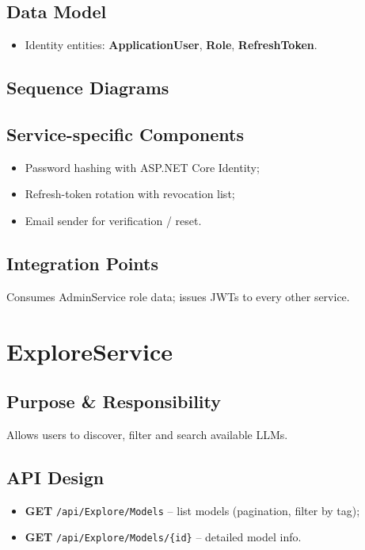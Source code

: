 \subsection{Data Model}
\begin{itemize}
  \item Identity entities: \textbf{ApplicationUser}, \textbf{Role}, \textbf{RefreshToken}.
\end{itemize}

\subsection{Sequence Diagrams}

\subsection{Service-specific Components}
\begin{itemize}
  \item Password hashing with ASP.NET Core Identity;
  \item Refresh-token rotation with revocation list;
  \item Email sender for verification / reset.
\end{itemize}

\subsection{Integration Points}
Consumes AdminService role data; issues JWTs to every other service.

\section{ExploreService}
\subsection{Purpose \& Responsibility}
Allows users to discover, filter and search available LLMs.

\subsection{API Design}
\begin{itemize}
  \item \textbf{GET} \texttt{/api/Explore/Models} – list models (pagination, filter by tag);
  \item \textbf{GET} \texttt{/api/Explore/Models/\{id\}} – detailed model info.
\end{itemize}

